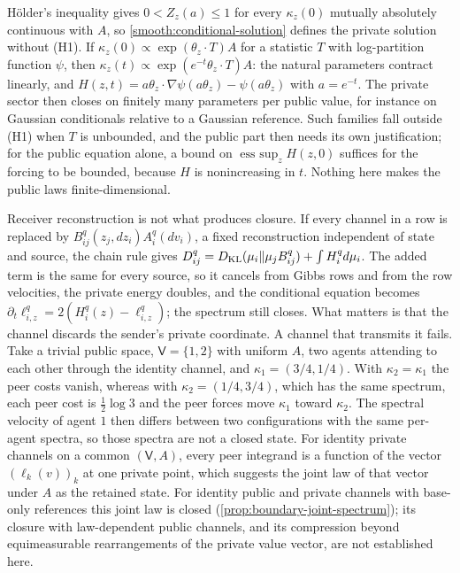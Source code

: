 H\"older's inequality gives $0<Z_z(a)\leq1$ for every $\kappa_z(0)$ mutually absolutely continuous with $A$, so \cref{smooth:conditional-solution} defines the private solution without (H1). If $\kappa_z(0)\propto\exp(\theta_z\cdot T)A$ for a statistic $T$ with log-partition function $\psi$, then $\kappa_z(t)\propto\exp(e^{-t}\theta_z\cdot T)A$: the natural parameters contract linearly, and $H(z,t)=a\theta_z\cdot\nabla\psi(a\theta_z)-\psi(a\theta_z)$ with $a=e^{-t}$. The private sector then closes on finitely many parameters per public value, for instance on Gaussian conditionals relative to a Gaussian reference. Such families fall outside (H1) when $T$ is unbounded, and the public part then needs its own justification; for the public equation alone, a bound on $\operatorname*{ess\ sup}_zH(z,0)$ suffices for the forcing to be bounded, because $H$ is nonincreasing in $t$. Nothing here makes the public laws finite-dimensional.

Receiver reconstruction is not what produces closure. If every channel in a row is replaced by $B_{ij}^q(z_j,dz_i)A_i^q(dv_i)$, a fixed reconstruction independent of state and source, the chain rule gives $D_{ij}^q=D_{\mathrm{KL}}(\mu_i\Vert\mu_jB_{ij}^q)+\int H_i^q d\mu_i$. The added term is the same for every source, so it cancels from Gibbs rows and from the row velocities, the private energy doubles, and the conditional equation becomes $\partial_t\ell_{i,z}^q=2(H_i^q(z)-\ell_{i,z}^q)$; the spectrum still closes. What matters is that the channel discards the sender's private coordinate. A channel that transmits it fails. Take a trivial public space, $\mathsf V=\{1,2\}$ with uniform $A$, two agents attending to each other through the identity channel, and $\kappa_1=(3/4,1/4)$. With $\kappa_2=\kappa_1$ the peer costs vanish, whereas with $\kappa_2=(1/4,3/4)$, which has the same spectrum, each peer cost is $\tfrac12\log3$ and the peer forces move $\kappa_1$ toward $\kappa_2$. The spectral velocity of agent $1$ then differs between two configurations with the same per-agent spectra, so those spectra are not a closed state. For identity private channels on a common $(\mathsf V,A)$, every peer integrand is a function of the vector $(\ell_{k}(v))_k$ at one private point, which suggests the joint law of that vector under $A$ as the retained state. For identity public and private channels with base-only references this joint law is closed (\cref{prop:boundary-joint-spectrum}); its closure with law-dependent public channels, and its compression beyond equimeasurable rearrangements of the private value vector, are not established here.

